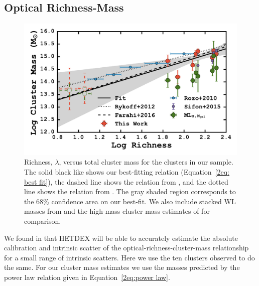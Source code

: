\subsection{Optical Richness-Mass}
\begin{figure}
	\includegraphics[width=\textwidth]{./figures2/massRichness.pdf} 
	\caption{Richness, $\lambda$, versus total cluster mass for the clusters in our sample. The solid black like shows our best-fitting relation (Equation~\protect\ref{2eq: best fit}), the dashed line shows the relation from \protect\cite{Farahi2016}, and the dotted line shows the relation from \protect\cite{Rykoff2012}. The gray shaded region corresponds to the 68\% confidence area on our best-fit. We also include stacked WL masses from \protect\cite{Rozo2010} and the high-mass cluster mass estimates of \protect\cite{Sifon2015} for comparison.}
\label{2fig:massRichness} 
\end{figure}

We found in  that HETDEX will be able to accurately estimate the absolute calibration and intrinsic scatter of the optical-richness-cluster-mass relationship for a small range of intrinsic scatters. Here we use the ten clusters observed to do the same. For our cluster mass estimates we use the masses predicted by the power law relation given in Equation~\ref{2eq:power law}. 

